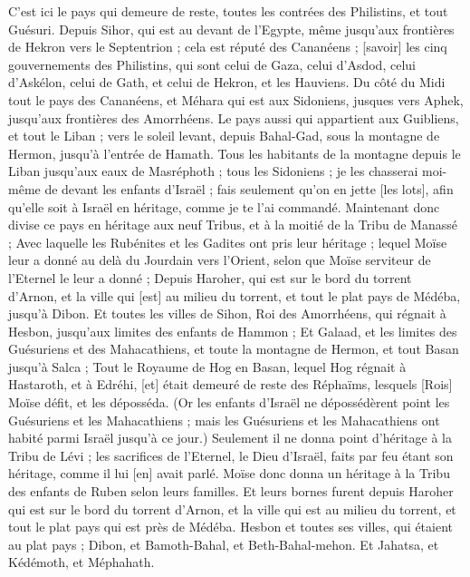 \begin{multicols}{2}
C'est ici le pays qui demeure de reste, toutes les contrées des Philistins, et tout Guésuri.
Depuis Sihor, qui est au devant de l'Egypte, même jusqu'aux frontières de Hekron vers le Septentrion ; cela est réputé des Cananéens ; [savoir] les cinq gouvernements des Philistins, qui sont celui de Gaza, celui d'Asdod, celui d'Askélon, celui de Gath, et celui de Hekron, et les Hauviens.
Du côté du Midi tout le pays des Cananéens, et Méhara qui est aux Sidoniens, jusques vers Aphek, jusqu'aux frontières des Amorrhéens.
Le pays aussi qui appartient aux Guibliens, et tout le Liban ; vers le soleil levant, depuis Bahal-Gad, sous la montagne de Hermon, jusqu'à l'entrée de Hamath.
Tous les habitants de la montagne depuis le Liban jusqu'aux eaux de Masréphoth ; tous les Sidoniens ; je les chasserai moi-même de devant les enfants d'Israël ; fais seulement qu'on en jette [les lots], afin qu'elle soit à Israël en héritage, comme je te l'ai commandé.
Maintenant donc divise ce pays en héritage aux neuf Tribus, et à la moitié de la Tribu de Manassé ;
Avec laquelle les Rubénites et les Gadites ont pris leur héritage ; lequel Moïse leur a donné au delà du Jourdain vers l'Orient, selon que Moïse serviteur de l'Eternel le leur a donné ;
Depuis Haroher, qui est sur le bord du torrent d'Arnon, et la ville qui [est] au milieu du torrent, et tout le plat pays de Médéba, jusqu'à Dibon.
Et toutes les villes de Sihon, Roi des Amorrhéens, qui régnait à Hesbon, jusqu'aux limites des enfants de Hammon ;
Et Galaad, et les limites des Guésuriens et des Mahacathiens, et toute la montagne de Hermon, et tout Basan jusqu'à Salca ;
Tout le Royaume de Hog en Basan, lequel Hog régnait à Hastaroth, et à Edréhi, [et] était demeuré de reste des Réphaïms, lesquels [Rois] Moïse défit, et les déposséda.
(Or les enfants d'Israël ne dépossédèrent point les Guésuriens et les Mahacathiens ; mais les Guésuriens et les Mahacathiens ont habité parmi Israël jusqu'à ce jour.)
Seulement il ne donna point d'héritage à la Tribu de Lévi ; les sacrifices de l'Eternel, le Dieu d'Israël, faits par feu étant son héritage, comme il lui [en] avait parlé.
Moïse donc donna un héritage à la Tribu des enfants de Ruben selon leurs familles.
Et leurs bornes furent depuis Haroher qui est sur le bord du torrent d'Arnon, et la ville qui est au milieu du torrent, et tout le plat pays qui est près de Médéba.
Hesbon et toutes ses villes, qui étaient au plat pays ; Dibon, et Bamoth-Bahal, et Beth-Bahal-mehon.
Et Jahatsa, et Kédémoth, et Méphahath.

\end{multicols}
